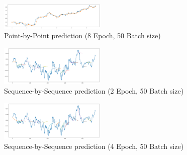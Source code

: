 \usepackage{fancyhdr}\documentclass[conference]{IEEEtran}
\begin{document}
\begin{figure}[htpb]
\begin{center}
\includegraphics[width=0.45\textwidth]{LSTM_source/PP_8_50.PNG}
\vspace{-0.2cm}
\caption{Point-by-Point prediction (8 Epoch, 50 Batch size)}
\label{fig_predict}
\end{center}
\vspace{-0.6cm}
\end{figure}

\begin{figure}[htpb]
\begin{center}
\includegraphics[width=0.45\textwidth]{LSTM_source/SS_2_50.PNG}
\vspace{-0.2cm}
\caption{Sequence-by-Sequence prediction (2 Epoch, 50 Batch size)}
\label{fig_predict}
\end{center}
\vspace{-0.6cm}
\end{figure}

\begin{figure}[htpb]
\begin{center}
\includegraphics[width=0.45\textwidth]{LSTM_source/SS_4_50.PNG}
\vspace{-0.2cm}
\caption{Sequence-by-Sequence prediction (4 Epoch, 50 Batch size)}
\label{fig_predict}
\end{center}
\vspace{-0.6cm}
\end{figure}
\end{document}
